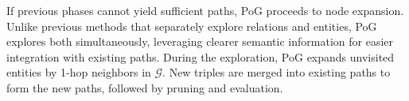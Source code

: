 If previous phases cannot yield sufficient paths, PoG proceeds to node expansion. Unlike previous methods \cite{tog1.0sun2023think,tog2.0ma2024think} that separately explore relations and entities, PoG explores both simultaneously, 
leveraging clearer semantic information for easier integration with existing paths. 
During the exploration, PoG expands unvisited entities by 1-hop neighbors in $\mathcal{G}$. New triples are merged into existing paths to form the new paths, followed by pruning and evaluation. 



